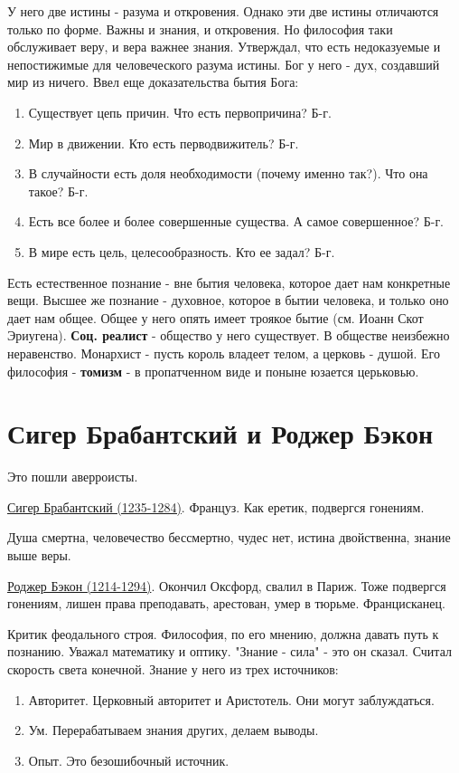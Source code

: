 У него две истины - разума и откровения. Однако эти две истины отличаются только по форме. Важны и знания, и откровения. Но философия таки обслуживает веру, и вера важнее знания.  Утверждал, что есть недоказуемые и непостижимые для человеческого разума истины. Бог у него - дух, создавший мир из ничего. Ввел еще доказательства бытия Бога:
\begin{enumerate}
\item Существует цепь причин. Что есть первопричина? Б-г.
\item Мир в движении. Кто есть перводвижитель? Б-г.
\item В случайности есть доля необходимости (почему именно так?). Что она такое? Б-г.
\item Есть все более и более совершенные существа. А самое совершенное? Б-г.
\item В мире есть цель, целесообразность. Кто ее задал? Б-г.
\end{enumerate}
Есть естественное познание - вне бытия человека, которое дает нам конкретные вещи. Высшее же познание  - духовное, которое в бытии человека, и только оно дает нам общее. Общее у него опять имеет троякое бытие (см. Иоанн Скот Эриугена).
\textbf{Соц. реалист} - общество у него существует. В обществе неизбежно неравенство. Монархист - пусть король владеет телом, а церковь - душой.
Его философия - \textbf{томизм} - в пропатченном виде и поныне юзается церьковью.

\section{Сигер Брабантский и Роджер Бэкон}
Это пошли аверроисты.

\underline{Сигер Брабантский (1235-1284)}. Француз. Как еретик, подвергся гонениям.

Душа смертна, человечество бессмертно, чудес нет, истина двойственна, знание выше веры.
 
\underline{Роджер Бэкон (1214-1294)}. Окончил Оксфорд, свалил в Париж. Тоже подвергся гонениям, лишен права преподавать, арестован, умер в тюрьме. Францисканец.

Критик феодального строя. Философия, по его мнению, должна давать путь к познанию. Уважал математику и оптику. "Знание - сила" - это он сказал. Считал скорость света конечной. Знание у него из трех источников:
\begin{enumerate}
\item Авторитет. Церковный авторитет и Аристотель. Они могут заблуждаться.
\item Ум. Перерабатываем знания других, делаем выводы. 
\item Опыт. Это безошибочный источник.
\end{enumerate}

